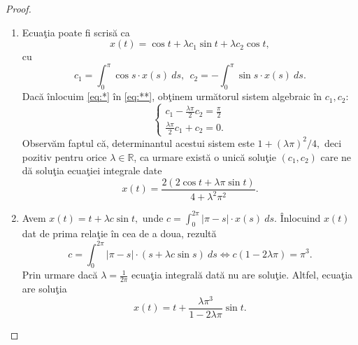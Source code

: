 \documentclass[a4paper,12pt,oneside]{report}
\begin{document}
\begin{proof}
\begin{enumerate}[label=(\alph*)]
  \item Ecua\c{t}ia poate fi scris\u{a} ca
        \begin{displaymath}
        	x\left ( t \right ) = \cos t + \lambda c_{1}\sin t + \lambda c_{2}\cos t, \label{eq:*} \tag{*}
        \end{displaymath}
cu
        \begin{displaymath}
        	c_{1} = \int_{0}^{\pi }\cos s \cdot x\left ( s \right ) \ ds,~~ c_{2} = -\int_{0}^{\pi }\sin s \cdot x\left ( s \right ) \ ds. \label{eq:**} \tag{**}
        \end{displaymath}
 Dac\u{a} \^{i}nlocuim \ref{eq:*} \^{i}n \ref{eq:**}, ob\c{t}inem urm\u{a}torul sistem algebraic \^{i}n \(c_{1}, c_{2}\):
        \begin{displaymath}
        	\left\{\begin{matrix}
        	c_{1} - \frac{\lambda \pi }{2}c_{2} = \frac{\pi }{2}\\
        	\frac{\lambda \pi }{2}c_{1} + c_{2} = 0.
        	\end{matrix}\right.
        \end{displaymath}
Observ\u{a}m faptul c\u{a}, determinantul acestui sistem este $1+ (\lambda \pi)^2/4,$ deci pozitiv pentru orice \(\lambda \in \mathbb{R}\), ca urmare exist\u{a} o unic\u{a}  solu\c{t}ie \(\left ( c_{1} , c_{2}\right )\) care ne d\u{a} solu\c{t}ia ecua\c{t}iei integrale date
        \begin{displaymath}
        	x\left ( t \right ) = \frac{2\left ( 2\cos t+ \lambda\pi\sin t \right )}{4 + \lambda^{2}\pi^{2}}.
        \end{displaymath}
        		      		      		      		      		      		
  \item Avem \(x\left ( t \right ) = t + \lambda c \sin t,\) unde \(c = \int_{0}^{2\pi}\left | \pi - s \right |\cdot x\left ( s \right ) \ ds\). \^{I}nlocuind \(x\left ( t \right )\) dat de prima rela\c{t}ie \^{i}n cea de a doua, rezult\u{a}
\begin{displaymath}
  c = \int_{0}^{2\pi} \left | \pi - s \right | \cdot \left ( s+ \lambda c\sin s \right ) \ ds \Leftrightarrow c\left ( 1- 2\lambda \pi \right ) = \pi^{3}.
\end{displaymath}
Prin urmare dac\u{a} \(\lambda = \frac{1}{2\pi}\) ecua\c{t}ia integral\u{a} dat\u{a} nu are solu\c{t}ie. Altfel, ecua\c{t}ia are solu\c{t}ia
\begin{displaymath}
  x\left ( t \right ) = t + \frac{\lambda \pi ^{3}}{1 - 2 \lambda \pi}\sin t.
\end{displaymath}
        		      		      		      		      		      		

\end{enumerate}
\end{proof}
\end{document}
